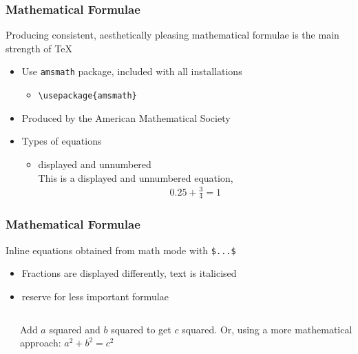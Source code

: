 \documentclass[11pt]{beamer}
\begin{document}
\begin{frame}[fragile]\frametitle{Mathematical Formulae}
Producing consistent, aesthetically pleasing mathematical formulae is the main strength of \TeX
\begin{itemize}
	\item Use \verb+amsmath+ package, included with all installations
	\begin{itemize}
		\item \verb+\usepackage{amsmath}+
	\end{itemize}
	\item Produced by the American Mathematical Society
	\item Types of equations
	\begin{itemize}
		\item displayed and unnumbered \\
			This is a displayed and unnumbered equation,
			\begin{align*}
				0.25+\frac{3}{4}=1
			\end{align*}
	\end{itemize}
\end{itemize}
\end{frame}

\begin{frame}[fragile]\frametitle{Mathematical Formulae}
Inline equations obtained from math mode with \verb+$...$+
\begin{itemize}
	\item Fractions are displayed differently, text is italicised
	\item reserve for less important formulae
\end{itemize}
\begin{columns}
\begin{column}{0.5\textwidth}
\end{column}
\begin{column}{0.5\textwidth}
Add $a$ squared and $b$ squared 
to get $c$ squared. Or, using 
a more mathematical approach: 
$a^2 + b^2 = c^2$ 
\end{column}
\end{columns}
\end{frame}
\end{document}
